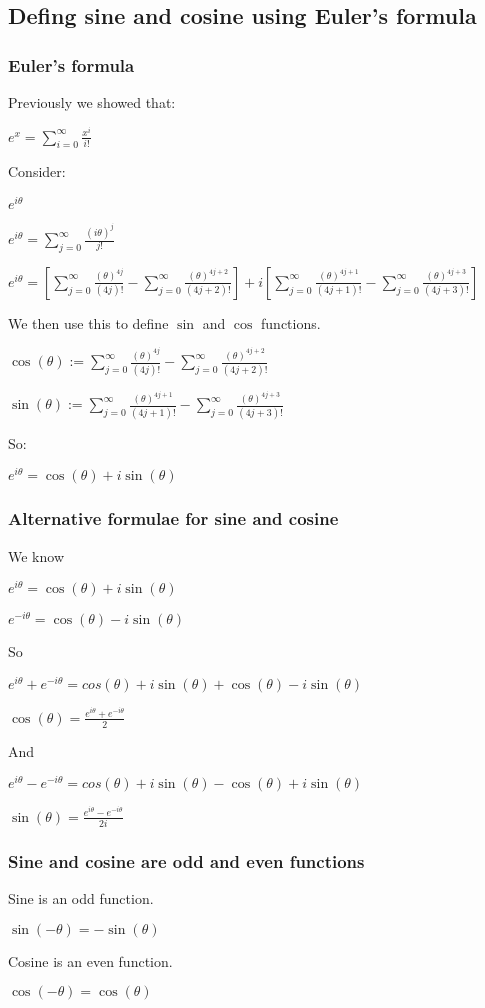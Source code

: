 
\subsection{Defing sine and cosine using Euler's formula}

\subsubsection{Euler's formula}

Previously we showed that:

$e^x=\sum_{i=0}^\infty \frac{x^i}{i!}$

Consider:

$e^{i\theta }$

$e^{i\theta }=\sum_{j=0}^\infty \frac{(i\theta )^j}{j!}$

$e^{i\theta }=[\sum_{j=0}^\infty \frac{(\theta )^{4j}}{(4j)!}-\sum_{j=0}^\infty \frac{(\theta )^{4j+2}}{(4j+2)!}]+i[\sum_{j=0}^\infty \frac{(\theta )^{4j+1}}{(4j+1)!}-\sum_{j=0}^\infty \frac{(\theta )^{4j+3}}{(4j+3)!}]$

We then use this to define \(\sin \) and \(\cos \) functions.

$\cos (\theta ):=\sum_{j=0}^\infty \frac{(\theta )^{4j}}{(4j)!}-\sum_{j=0}^\infty \frac{(\theta )^{4j+2}}{(4j+2)!}$

$\sin (\theta ):=\sum_{j=0}^\infty \frac{(\theta )^{4j+1}}{(4j+1)!}-\sum_{j=0}^\infty \frac{(\theta )^{4j+3}}{(4j+3)!}$

So:

$e^{i\theta }=\cos (\theta )+i\sin (\theta )$

\subsubsection{Alternative formulae for sine and cosine}

We know

$e^{i\theta }=\cos (\theta )+i\sin (\theta )$

$e^{-i\theta }=\cos (\theta )-i\sin (\theta )$

So

$e^{i\theta }+e^{-i\theta }=cos (\theta )+i\sin (\theta )+\cos (\theta )-i\sin (\theta )$

$\cos (\theta )=\frac{e^{i\theta }+e^{-i\theta }}{2}$

And

$e^{i\theta }-e^{-i\theta }=cos (\theta )+i\sin (\theta )-\cos (\theta )+i\sin (\theta )$

$\sin (\theta )=\frac{e^{i\theta }-e^{-i\theta }}{2i}$

\subsubsection{Sine and cosine are odd and even functions}

Sine is an odd function.

$\sin (-\theta )=-\sin (\theta )$

Cosine is an even function.

$\cos (-\theta )=\cos (\theta )$





